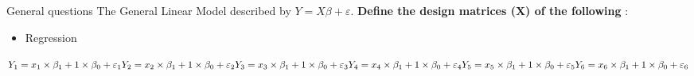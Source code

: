 \documentclass{beamer}
\begin{document}
\begin{frame}{General questions}   
The General Linear Model described by $Y=X\beta+\varepsilon$. \textbf{Define the design matrices (X) of the following} :
  
      \begin{itemize}
	\item Regression
      \end{itemize}
	
      \begin{center}
	$
	Y_{1} = x_{1} \times \beta_{1} + 1 \times \beta_{0} + \varepsilon_{1} \linebreak 
	Y_{2} = x_{2} \times \beta_{1} + 1 \times \beta_{0} + \varepsilon_{2} \linebreak 
	Y_{3} = x_{3} \times \beta_{1} + 1 \times \beta_{0} + \varepsilon_{3} \linebreak
	Y_{4} = x_{4} \times \beta_{1} + 1 \times \beta_{0} + \varepsilon_{4} \linebreak 
	Y_{5} = x_{5} \times \beta_{1} + 1 \times \beta_{0} + \varepsilon_{5} \linebreak 
	Y_{6} = x_{6} \times \beta_{1} + 1 \times \beta_{0} + \varepsilon_{6} \linebreak 
	$
      \end{center}
\end{frame}
\end{document}
